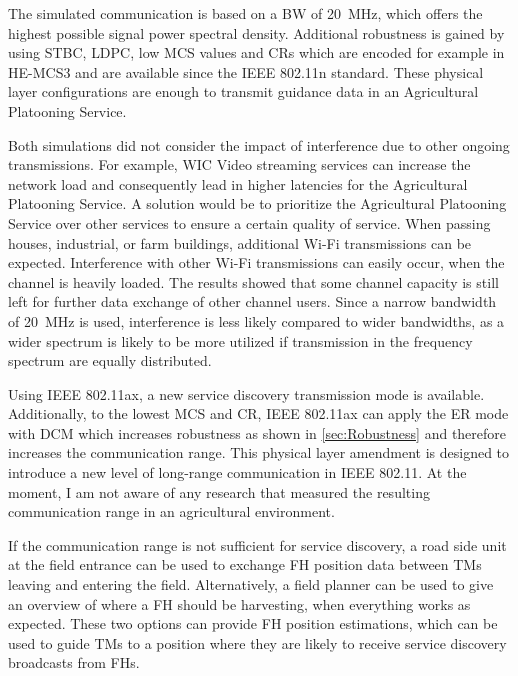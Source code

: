 The simulated communication is based on a \ac{BW} of \SI{20}{\mega\hertz}, which offers the highest possible signal power spectral density.
Additional robustness is gained by using \ac{STBC}, \ac{LDPC}, low \ac{MCS} values and \ac{CR}s which are encoded for example in
\ac{HE}-\ac{MCS}3 and are available since the IEEE 802.11n standard.
These physical layer configurations are enough to transmit guidance data in an Agricultural Platooning Service.

Both simulations did not consider the impact of interference due to other ongoing transmissions.
For example, \ac{WIC} Video streaming services can increase the network load and consequently lead in higher latencies for
the Agricultural Platooning Service.
A solution would be to prioritize the Agricultural Platooning Service over other services
to ensure a certain quality of service.
When passing houses, industrial, or farm buildings, additional Wi-Fi transmissions can be expected.
Interference with other Wi-Fi
transmissions can easily occur, when the channel is heavily loaded.
The results showed that some channel capacity is still left for further data exchange of other channel users.
Since a narrow bandwidth of \SI{20}{\mega\hertz} is used, interference is less likely compared to wider bandwidths,
as a wider spectrum is likely to be more utilized if transmission in the frequency spectrum are equally distributed.


Using IEEE 802.11ax, a new service discovery transmission mode is available.
Additionally, to the lowest \ac{MCS} and \ac{CR},
IEEE 802.11ax can apply the \ac{ER} mode with \ac{DCM} which increases robustness as shown in \autoref{sec:Robustness}
and therefore increases the communication range.
This physical layer amendment is designed to introduce a new level of long-range communication in IEEE 802.11.
At the moment, I am not aware of any research that measured the resulting communication range in an agricultural environment.

If the communication range is not sufficient for service discovery, a road side unit at the field entrance can be used to exchange \ac{FH} position data
between \acp{TM} leaving and entering the field.
Alternatively, a field planner can be used to give an overview of where a \ac{FH} should be harvesting,
when everything works as expected.
These two options can provide \ac{FH} position estimations, which can be used to guide \acp{TM} to a position where they are likely
to receive service discovery broadcasts from \acp{FH}.







